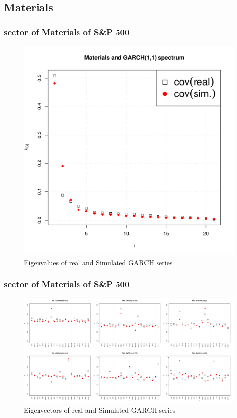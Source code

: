 \documentclass{beamer}
\begin{document}
\subsection{Materials}
\begin{frame}
  \frametitle{sector of Materials of S\&P 500}
  \begin{figure}[htb!]
    \centering
    \includegraphics[scale=0.35]{Materials_eigenvalues.pdf}
    \caption{\scriptsize Eigenvalues of real and Simulated GARCH series}
  \end{figure}
\end{frame}

\begin{frame}
  \frametitle{sector of Materials of S\&P 500}
  \begin{figure}[htb!]
    \centering
    \includegraphics[width=1.0\linewidth]{Materials_eigenvectors1.pdf}
    \caption{\scriptsize Eigenvectors of real and Simulated GARCH series}
  \end{figure}
\end{frame}
\end{document}
